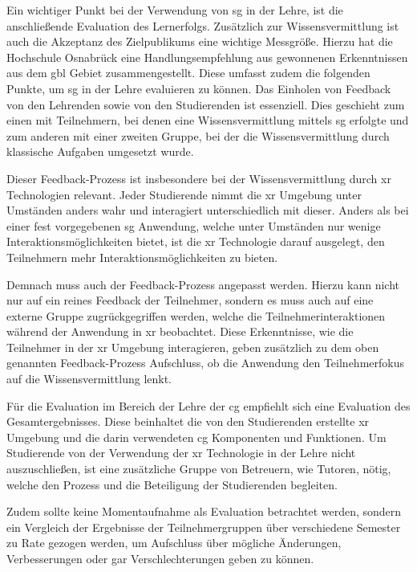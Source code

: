\documentclass[conference]{IEEEtran}
\begin{document}
Ein wichtiger Punkt bei der Verwendung von \gls{sg} in der Lehre, ist die anschließende Evaluation des Lernerfolgs.
Zusätzlich zur Wissensvermittlung ist auch die Akzeptanz des Zielpublikums eine wichtige Messgröße.
Hierzu hat die Hochschule Osnabrück eine Handlungsempfehlung aus gewonnenen Erkenntnissen aus dem \gls{gbl} Gebiet zusammengestellt\cite{a3}.
Diese umfasst zudem die folgenden Punkte, um \gls{sg} in der Lehre evaluieren zu können.
Das Einholen von Feedback von den Lehrenden sowie von den Studierenden ist essenziell.
Dies geschieht zum einen mit Teilnehmern, bei denen eine Wissensvermittlung mittels \gls{sg} erfolgte und zum anderen mit einer zweiten Gruppe,
bei der die Wissensvermittlung durch klassische Aufgaben umgesetzt wurde.

Dieser Feedback-Prozess ist insbesondere bei der Wissensvermittlung durch \gls{xr} Technologien relevant.
Jeder Studierende nimmt die \gls{xr} Umgebung unter Umständen anders wahr und interagiert unterschiedlich mit dieser.
Anders als bei einer fest vorgegebenen \gls{sg} Anwendung, welche unter Umständen nur wenige Interaktionsmöglichkeiten bietet, ist die \gls{xr} Technologie
darauf ausgelegt, den Teilnehmern mehr Interaktionsmöglichkeiten zu bieten.

Demnach muss auch der Feedback-Prozess angepasst werden. Hierzu kann nicht nur auf ein reines Feedback der Teilnehmer,
sondern es muss auch auf eine externe Gruppe zugrückgegriffen werden, welche die Teilnehmerinteraktionen während der Anwendung in \gls{xr} beobachtet.
Diese Erkenntnisse, wie die Teilnehmer in der \gls{xr} Umgebung interagieren, geben zusätzlich zu dem oben genannten Feedback-Prozess Aufschluss,
ob die Anwendung den Teilnehmerfokus auf die Wissensvermittlung lenkt.

Für die Evaluation im Bereich der Lehre der \gls{cg} empfiehlt sich eine Evaluation des Gesamtergebnisses.
Diese beinhaltet die von den Studierenden erstellte \gls{xr} Umgebung und die darin verwendeten \gls{cg} Komponenten und Funktionen.
Um Studierende von der Verwendung der \gls{xr} Technologie in der Lehre nicht auszuschließen, ist eine zusätzliche Gruppe von Betreuern, wie Tutoren, nötig,
welche den Prozess und die Beteiligung der Studierenden begleiten.

Zudem sollte keine Momentaufnahme als Evaluation betrachtet werden, sondern ein Vergleich der Ergebnisse der Teilnehmergruppen über verschiedene Semester zu Rate gezogen werden,
um Aufschluss über mögliche Änderungen, Verbesserungen oder gar Verschlechterungen geben zu können.
\end{document}
